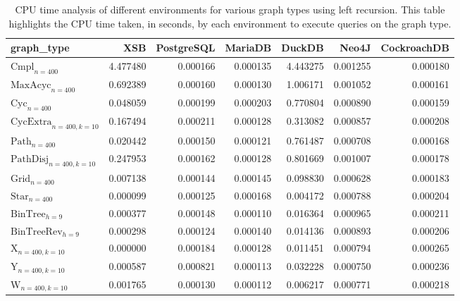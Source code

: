 \begin{table}
\caption{CPU time analysis of different environments for various graph types using left recursion. This table highlights the CPU time taken, in seconds, by each environment to execute queries on the graph type.}
\label{table:results}
\begin{tabular}{lrrrrrr}
\toprule
graph_type & XSB & PostgreSQL & MariaDB & DuckDB & Neo4J & CockroachDB \\
\midrule
$\text{Cmpl}_{n=400}$ & 4.477480 & 0.000166 & 0.000135 & 4.443275 & 0.001255 & 0.000180 \\
$\text{MaxAcyc}_{n=400}$ & 0.692389 & 0.000160 & 0.000130 & 1.006171 & 0.001052 & 0.000161 \\
$\text{Cyc}_{n=400}$ & 0.048059 & 0.000199 & 0.000203 & 0.770804 & 0.000890 & 0.000159 \\
$\text{CycExtra}_{n=400,k=10}$ & 0.167494 & 0.000211 & 0.000128 & 0.313082 & 0.000857 & 0.000208 \\
$\text{Path}_{n=400}$ & 0.020442 & 0.000150 & 0.000121 & 0.761487 & 0.000708 & 0.000168 \\
$\text{PathDisj}_{n=400,k=10}$ & 0.247953 & 0.000162 & 0.000128 & 0.801669 & 0.001007 & 0.000178 \\
$\text{Grid}_{n=400}$ & 0.007138 & 0.000144 & 0.000145 & 0.098830 & 0.000628 & 0.000183 \\
$\text{Star}_{n=400}$ & 0.000099 & 0.000125 & 0.000168 & 0.004172 & 0.000788 & 0.000204 \\
$\text{BinTree}_{h=9}$ & 0.000377 & 0.000148 & 0.000110 & 0.016364 & 0.000965 & 0.000211 \\
$\text{BinTreeRev}_{h=9}$ & 0.000298 & 0.000124 & 0.000140 & 0.014136 & 0.000893 & 0.000206 \\
$\text{X}_{n=400, k=10}$ & 0.000000 & 0.000184 & 0.000128 & 0.011451 & 0.000794 & 0.000265 \\
$\text{Y}_{n=400,k=10}$ & 0.000587 & 0.000821 & 0.000113 & 0.032228 & 0.000750 & 0.000236 \\
$\text{W}_{n=400,k=10}$ & 0.001765 & 0.000130 & 0.000112 & 0.006217 & 0.000771 & 0.000218 \\
\bottomrule
\end{tabular}
\end{table}
